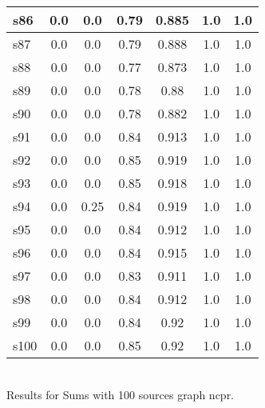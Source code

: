 \documentclass{article}
\begin{document}
\begin{tabular}{|l|c|c|c|c|c|c|}
\hline
s86 &0.0 & 0.0 & 0.79 & 0.885 & 1.0 & 1.0\\
\hline
s87 &0.0 & 0.0 & 0.79 & 0.888 & 1.0 & 1.0\\
\hline
s88 &0.0 & 0.0 & 0.77 & 0.873 & 1.0 & 1.0\\
\hline
s89 &0.0 & 0.0 & 0.78 & 0.88 & 1.0 & 1.0\\
\hline
s90 &0.0 & 0.0 & 0.78 & 0.882 & 1.0 & 1.0\\
\hline
s91 &0.0 & 0.0 & 0.84 & 0.913 & 1.0 & 1.0\\
\hline
s92 &0.0 & 0.0 & 0.85 & 0.919 & 1.0 & 1.0\\
\hline
s93 &0.0 & 0.0 & 0.85 & 0.918 & 1.0 & 1.0\\
\hline
s94 &0.0 & 0.25 & 0.84 & 0.919 & 1.0 & 1.0\\
\hline
s95 &0.0 & 0.0 & 0.84 & 0.912 & 1.0 & 1.0\\
\hline
s96 &0.0 & 0.0 & 0.84 & 0.915 & 1.0 & 1.0\\
\hline
s97 &0.0 & 0.0 & 0.83 & 0.911 & 1.0 & 1.0\\
\hline
s98 &0.0 & 0.0 & 0.84 & 0.912 & 1.0 & 1.0\\
\hline
s99 &0.0 & 0.0 & 0.84 & 0.92 & 1.0 & 1.0\\
\hline
s100 &0.0 & 0.0 & 0.85 & 0.92 & 1.0 & 1.0\\
\hline
\end{tabular}\\

\noindent Results for Sums with 100 sources graph ncpr.
\end{document}

